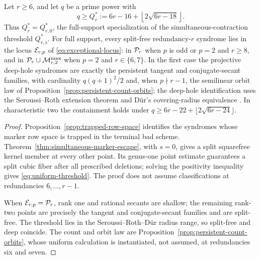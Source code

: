\begin{theorem}
\label{thm:recursive-carrier}%
%
%
%
%
Let \(r\geq6\), and let \(q\) be a prime power with
\begin{equation}\label{eq:uniform-threshold}
 q\geq Q_r^*:=6r-16+\left\lfloor2\sqrt{6r-18}\right\rfloor.
\end{equation}
Thus \(Q_r^*=Q^*_{r,0}\), the full-support specialization of the
simultaneous-contraction threshold \(Q^*_{r,s}\).
For full support, every split-free redundancy-\(r\) syndrome lies in the
locus \(\mathcal E_{r,p}\) of \eqref{eq:exceptional-locus}: in \(\mathcal P_r\) when
\(p\) is odd or \(p=2\) and \(r\geq8\), and in
\(\mathcal P_r\cup\mathcal M^{\max}_{r,2}\) when \(p=2\) and \(r\in\{6,7\}\).
In the first case the projective deep-hole syndromes are exactly the
persistent tangent and conjugate-secant families, with cardinality
\(q(q+1)^2/2\) and, when \(p\nmid r-1\), the semilinear orbit law of
Proposition~\ref{prop:persistent-count-orbits}; the deep-hole
identification uses the Seroussi--Roth extension theorem
\cite[Thm.~1]{SeroussiRoth1986} and D\"ur's covering-radius equivalence
\cite{Dur1994}.  In characteristic two the containment holds under
\(q\geq6r-22+\lfloor2\sqrt{6r-24}\rfloor\).
\end{theorem}

\begin{proof}
Proposition~\ref{prop:trapped-row-space} identifies the syndromes whose
marker row space is trapped in the terminal bad scheme.
Theorem~\ref{thm:simultaneous-marker-escape}, with \(s=0\),
gives a split squarefree kernel member at every other point.  Its
genus-one point estimate guarantees a split cubic fiber after all prescribed
deletions; solving the positivity inequality gives
\eqref{eq:uniform-threshold}.  The proof does not assume classifications at
redundancies \(6,\ldots,r-1\).

When \(\mathcal E_{r,p}=\mathcal P_r\), rank one and rational secants are shallow;
the remaining rank-two points are precisely the tangent and conjugate-secant
families and are split-free.  The threshold lies in the
Seroussi--Roth--Dür radius range, so split-free and deep coincide.  The count
and orbit law are Proposition~\ref{prop:persistent-count-orbits}, whose
uniform calculation is instantiated, not assumed, at redundancies six and
seven.
\end{proof}

